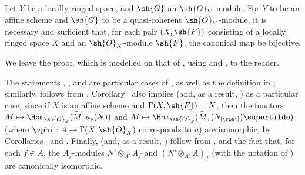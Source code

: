 \begin{corollary}[1.8.10]
\label{I.1.8.10}
Let $Y$ be a locally ringed space, and $\sh{G}$ an $\sh{O}_Y$-module.
For $Y$ to be an affine scheme and $\sh{G}$ to be a quasi-coherent $\sh{O}_Y$-module, it is necessary and sufficient that, for each pair $(X,\sh{F})$ consisting of a locally ringed space $X$ and an $\sh{O}_X$-module $\sh{F}$, the canonical map  be bijective.
\end{corollary}

We leave the proof, which is modelled on that of , using  and , to the reader.

\begin{remark}[1.8.11]
\label{I.1.8.11}
The statements , , and  are particular cases of , as well as the definition in ;
similarly,  follows from .
Corollary~ also implies  (and, as a result, ) as a particular case, since if $X$ is an affine scheme and $\Gamma(X,\sh{F})=N$, then the functors $M\mapsto\Hom_{\sh{O}_S}(\widetilde{M},u_*(\widetilde{N}))$ and $M\mapsto\Hom_{\sh{O}_S}(\widetilde{M},(N_{[\vphi]})\supertilde)$ (where $\vphi:A\to\Gamma(X,\sh{O}_X)$ corresponds to $u$) are isomorphic, by Corollaries~ and .
Finally,  (and, as a result, ) follow from , and the fact that, for each $f\in A$, the $A_f$-modules $N'\otimes_{A'}A_f$ and $(N'\otimes_{A'}A)_f$ (with the notation of ) are canonically isomorphic.
\end{remark}
